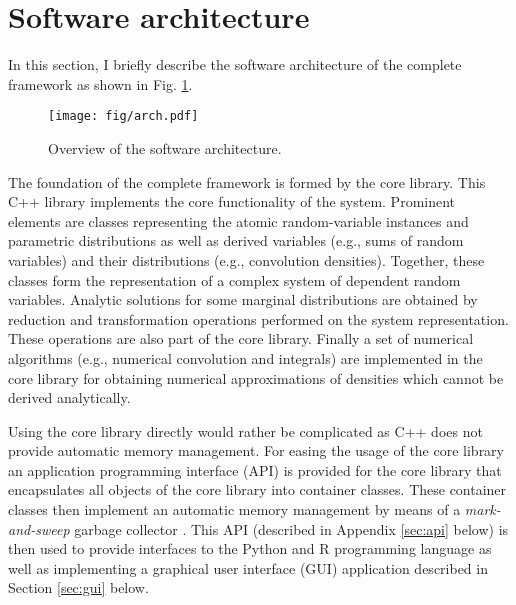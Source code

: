 \section{Software architecture}
In this section, I briefly describe the software architecture of the complete  framework as shown in Fig. \ref{fig:arch}. 

\begin{figure} [!ht]
 \centering
 \texttt{[image: fig/arch.pdf]}
 \caption{Overview of the  software architecture.} \label{fig:arch}
\end{figure}

The foundation of the complete framework is formed by the  core library. This C++ library implements the core functionality of the system. Prominent elements are classes representing the atomic random-variable instances and parametric distributions as well as derived variables (e.g., sums of random variables) and their distributions (e.g., convolution densities).  Together, these classes form the representation of a complex system of dependent random variables. Analytic solutions for some marginal distributions are obtained by reduction and transformation operations performed on the system representation. These operations are also part of the core library. Finally a set of numerical algorithms (e.g., numerical convolution and integrals) are implemented in the core library for obtaining numerical approximations of densities which cannot be derived analytically. 

Using the core library directly would rather be complicated as C++ does not provide automatic memory management. For easing the usage of the core library an application programming interface (API) is provided for the core library that encapsulates all objects of the core library into container classes. These container classes then implement an automatic memory management by means of a \emph{mark-and-sweep} garbage collector \cite[e.g.,][]{Aho2007}. This API (described in Appendix \ref{sec:api} below) is then used to provide interfaces to the Python and R programming language as well as implementing a graphical user interface (GUI) application described in Section \ref{sec:gui} below.